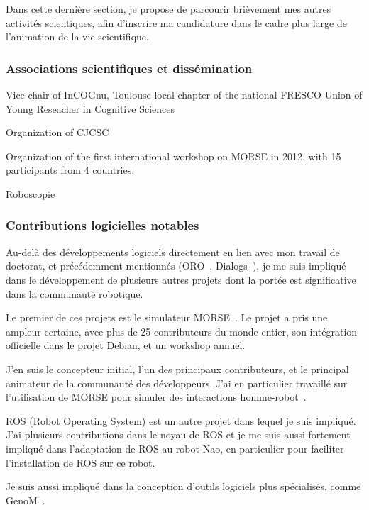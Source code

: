 \documentclass[a4paper]{article}
\begin{document}
Dans cette dernière section, je propose de parcourir brièvement mes autres
activités scientiques, afin d'inscrire ma candidature dans le cadre plus large
de l'animation de la vie scientifique.

\subsubsection{Associations scientifiques et dissémination}


Vice-chair of InCOGnu, Toulouse local chapter of the national FRESCO Union of Young Reseacher in Cognitive Sciences

Organization of CJCSC

Organization of the first international workshop on MORSE in 2012, with 15 participants from 4 countries.

Roboscopie~\cite{lemaignan2012roboscopie}

\subsubsection{Contributions logicielles notables}

Au-delà des développements logiciels directement en lien avec mon travail de
doctorat, et précédemment mentionnés (ORO~\cite{Lemaignan2010}, {\sc
Dialogs}~\cite{Lemaignan2011a}), je me suis impliqué dans le développement de
plusieurs autres projets dont la portée est significative dans la communauté
robotique.

Le premier de ces projets est le simulateur MORSE~\cite{Echeverria2011,
echeverria2012simulating}. Le projet a pris une ampleur certaine, avec plus de
25 contributeurs du monde entier, son intégration officielle dans le projet
Debian, et un workshop annuel.

J'en suis le concepteur initial, l'un des principaux contributeurs, et le
principal animateur de la communauté des développeurs. J'ai en particulier
travaillé sur l'utilisation de MORSE pour simuler des interactions
homme-robot~\cite{lemaignan2012morse}.

ROS (Robot Operating System) est un autre projet dans lequel je suis impliqué.
J'ai plusieurs contributions dans le noyau de ROS et je me suis aussi fortement
impliqué dans l'adaptation de ROS au robot Nao, en particulier pour faciliter
l'installation de ROS sur ce robot.

Je suis aussi impliqué dans la conception d'outils logiciels plus spécialisés,
comme GenoM~\cite{mallet2010genom3}.
\end{document}
